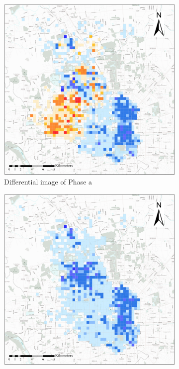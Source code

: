 \documentclass[preprints,ijgi,submit,moreauthors]{Definitions/mdpi}
\begin{document}
\begin{figure}[ht]
    \vspace{6pt}
    \begin{subfigure}{.3\textwidth}
        \includegraphics[width=\textwidth]{Figures/BSSMinusmp1.eps}
        \caption{Differential image of Phase a}
    \end{subfigure}
        \begin{subfigure}{.3\textwidth}
        \includegraphics[width=\textwidth]{Figures/BSSMinusmp2.eps}

\end{subfigure}
\end{figure}
\end{document}
